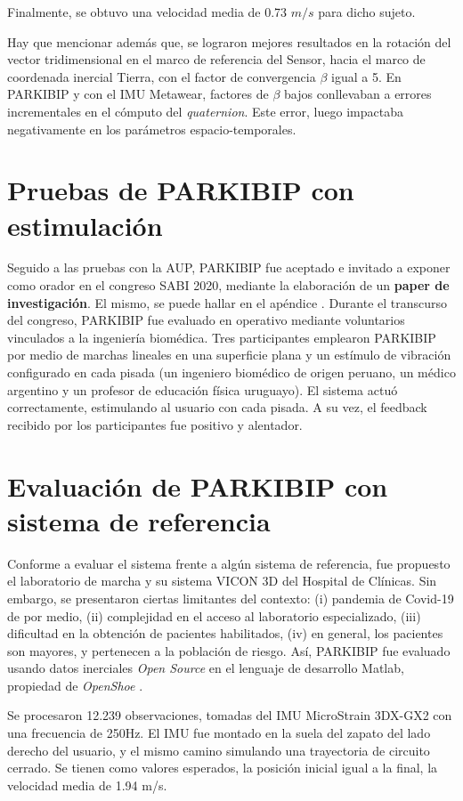 Finalmente, se obtuvo una velocidad media de 0.73 $m/s$ para dicho sujeto.

Hay que mencionar además que, se lograron mejores resultados en la rotación del vector tridimensional en el marco de referencia del Sensor, hacia el marco de coordenada inercial Tierra, con el factor de convergencia $\beta$ igual a 5. En PARKIBIP y con el IMU Metawear, factores de $\beta$ bajos conllevaban a errores incrementales en el cómputo del \textit{quaternion}. Este error, luego impactaba negativamente en los parámetros espacio-temporales.

\section{Pruebas de PARKIBIP con estimulación}

Seguido a las pruebas con la AUP, PARKIBIP fue aceptado e invitado a exponer como orador en el congreso SABI 2020, mediante la elaboración de un \textbf{paper de investigación}. El mismo, se puede hallar en el apéndice . Durante el transcurso del congreso, PARKIBIP fue evaluado en operativo mediante voluntarios vinculados a la ingeniería biomédica. Tres participantes emplearon PARKIBIP por medio de marchas lineales en una superficie plana y un estímulo de vibración configurado en cada pisada (un ingeniero biomédico de origen peruano, un médico argentino y un profesor de educación física uruguayo). El sistema actuó correctamente, estimulando al usuario con cada pisada. A su vez, el feedback recibido por los participantes fue positivo y alentador.

\section{Evaluación de PARKIBIP con sistema de referencia}

Conforme a evaluar el sistema frente a algún sistema de referencia, fue propuesto el laboratorio de marcha y su sistema VICON 3D del Hospital de Clínicas. Sin embargo, se presentaron ciertas limitantes del contexto: (i) pandemia de Covid-19 de por medio, (ii) complejidad en el acceso al laboratorio especializado, (iii) dificultad en la obtención de pacientes habilitados, (iv) en general, los pacientes son mayores, y pertenecen a la población de riesgo. Así, PARKIBIP fue evaluado usando datos inerciales \textit{Open Source} en el lenguaje de desarrollo Matlab, propiedad de \textit{OpenShoe} \cite{openshoe}.

Se procesaron 12.239 observaciones, tomadas del IMU  MicroStrain 3DX-GX2 con una frecuencia de 250Hz. El IMU fue montado en la suela del zapato del lado derecho del usuario, y el mismo camino simulando una trayectoria de circuito cerrado. Se tienen como valores esperados, la posición inicial igual a la final, la velocidad media de 1.94 m/s.

